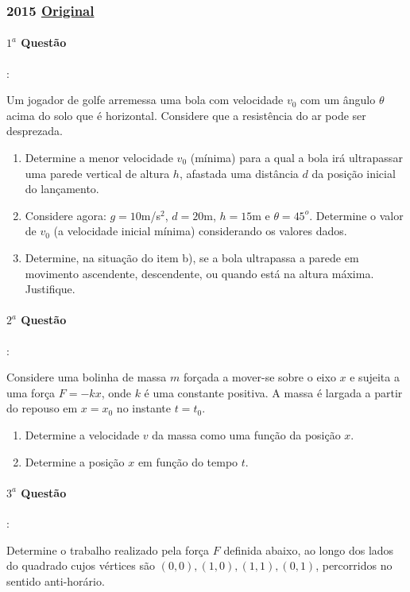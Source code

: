 \documentclass[12pt,a4paper]{article}
\newcommand{\original}[1]{\tiny \href{#1}{Original} \normalsize}
\begin{document}
\subsubsection{2015 \original{https://drive.google.com/file/d/1HRjfX3TmF9oLu2CmCn0ySnKPe9LkM5U7/view?usp=sharing}}

\paragraph{$1^a$ Questão}:

Um jogador de golfe arremessa uma bola com velocidade $v_0$ com um ângulo $\theta$ acima do solo que é horizontal. Considere que a resistência do ar
pode ser desprezada. 
\begin{enumerate}[label=\alph*)]
\item Determine a menor velocidade $v_0$ (mínima) para a qual a bola irá ultrapassar uma parede vertical de altura $h$, afastada uma distância $d$ da posição inicial do lançamento.
\item Considere agora: $g=10$m/s$^2$, $d=20$m, $h=15$m e $\theta = 45^o$. Determine o valor de $v_0$ (a velocidade inicial mínima) considerando os valores dados.
\item Determine, na situação do item b), se a bola ultrapassa a parede em movimento ascendente, descendente, ou quando está na altura máxima. Justifique.
\end{enumerate}

\paragraph{$2^a$ Questão}:

Considere uma bolinha de massa $m$ forçada a mover-se sobre o eixo $x$ e sujeita a uma força $F=-kx$, onde $k$ é uma constante positiva. A massa é largada a partir do repouso em $x=x_0$ no instante $t=t_0$.
\begin{enumerate}[label=\alph*)]
\item Determine a velocidade $v$ da massa como uma função da posição $x$.
\item Determine a posição $x$ em função do tempo $t$.
\end{enumerate}
\paragraph{$3^a$ Questão}:

Determine o trabalho realizado pela força $F$ definida abaixo, ao longo dos lados do quadrado cujos vértices são $(0,0),(1,0),(1,1),(0,1)$, percorridos no sentido anti-horário.
\end{document}

